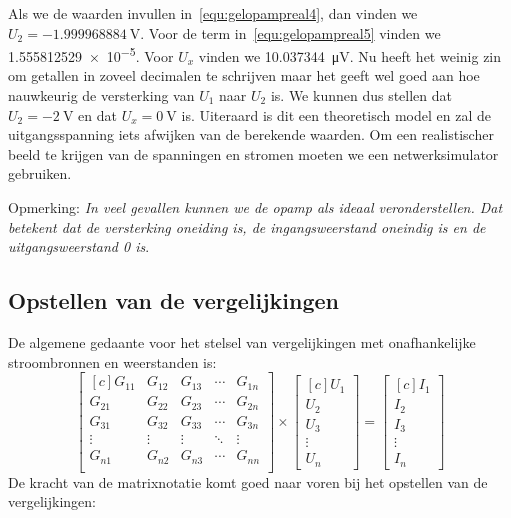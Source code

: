 \begin{example}
Als we de waarden invullen in~\eqref{equ:gelopampreal4}, dan vinden we $U_2 = \SI{-1.999968884}{\volt}$. Voor de term in~\eqref{equ:gelopampreal5} vinden we \num{1.555812529e-5}. Voor $U_x$ vinden we \SI{10.037344}{\micro\volt}. Nu heeft het weinig zin om getallen in zoveel decimalen te schrijven maar het geeft wel goed aan hoe nauwkeurig de versterking van $U_1$ naar $U_2$ is. We kunnen dus stellen dat $U_2 = \SI{-2}{\volt}$ en dat $U_x = \SI{0}{\volt}$ is. Uiteraard is dit een theoretisch model en zal de uitgangsspanning iets afwijken van de berekende waarden. Om een realistischer beeld te krijgen van de spanningen en stromen moeten we een netwerksimulator gebruiken.

Opmerking: \textsl{In veel gevallen kunnen we de opamp als ideaal veronderstellen. Dat betekent dat de versterking oneiding is, de ingangsweerstand oneindig is en de uitgangsweerstand 0 is}.

\end{example}

\subsection{Opstellen van de vergelijkingen}
De algemene gedaante voor het stelsel van vergelijkingen met onafhankelijke stroombronnen en weerstanden is:
%
\begin{equation}
\begin{bmatrix*}[c]
G_{11} & G_{12} & G_{13} & \cdots & G_{1n} \\
G_{21} & G_{22} & G_{23} & \cdots & G_{2n} \\
G_{31} & G_{32} & G_{33} & \cdots & G_{3n} \\
\vdots & \vdots & \vdots & \ddots & \vdots \\
G_{n1} & G_{n2} & G_{n3} & \cdots & G_{nn} \\
\end{bmatrix*} \times
\begin{bmatrix*}[c]
U_1 \\ U_2 \\ U_3 \\ \vdots \\ U_n
\end{bmatrix*} =
\begin{bmatrix*}[c]
I_1 \\ I_2 \\ I_3 \\ \vdots \\ I_n
\end{bmatrix*}
\end{equation}
%
De kracht van de matrixnotatie komt goed naar voren bij het opstellen van de vergelijkingen:

